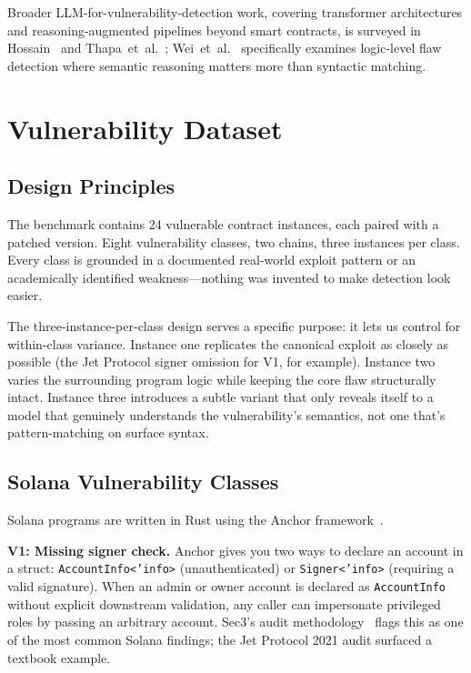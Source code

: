 \documentclass[journal]{IEEEtran}
\begin{document}
Broader LLM-for-vulnerability-detection work, covering transformer
architectures and reasoning-augmented pipelines beyond smart contracts,
is surveyed in Hossain~\cite{hossain2025llmsc} and
Thapa~et~al.~\cite{thapa2022transformer};
Wei~et~al.~\cite{wei2025logicmeets} specifically examines logic-level
flaw detection where semantic reasoning matters more than syntactic matching.

\section{Vulnerability Dataset}
\label{sec:dataset}

\subsection{Design Principles}

The benchmark contains 24 vulnerable contract instances, each paired with a
patched version.
Eight vulnerability classes, two chains, three instances per class.
Every class is grounded in a documented real-world exploit pattern or an
academically identified weakness---nothing was invented to make detection
look easier.

The three-instance-per-class design serves a specific purpose: it lets us
control for within-class variance.
Instance one replicates the canonical exploit as closely as possible (the Jet
Protocol signer omission for V1, for example).
Instance two varies the surrounding program logic while keeping the core flaw
structurally intact.
Instance three introduces a subtle variant that only reveals itself to a model
that genuinely understands the vulnerability's semantics, not one that's
pattern-matching on surface syntax.

\subsection{Solana Vulnerability Classes}

Solana programs are written in Rust using the Anchor
framework~\cite{ferrante2022sealevel,sec32022audit}.

\textbf{V1: Missing signer check.}
Anchor gives you two ways to declare an account in a struct:
\texttt{AccountInfo<'info>} (unauthenticated) or \texttt{Signer<'info>}
(requiring a valid signature).
When an admin or owner account is declared as \texttt{AccountInfo} without
explicit downstream validation, any caller can impersonate privileged roles
by passing an arbitrary account.
Sec3's audit methodology~\cite{sec32022audit} flags this as one of the
most common Solana findings; the Jet Protocol 2021 audit surfaced a
textbook example.
\end{document}
